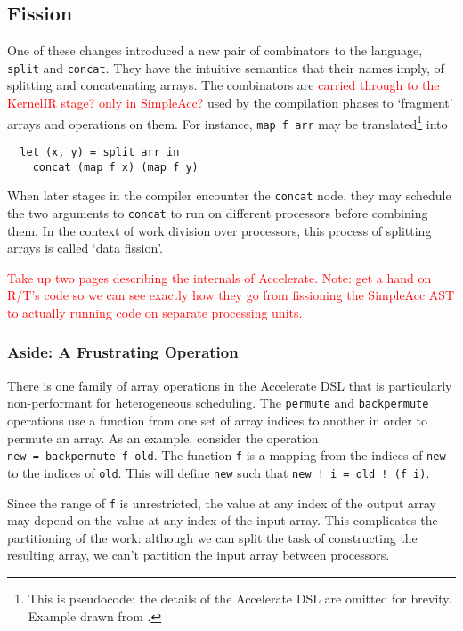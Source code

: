 \documentclass[a4paper,12pt]{article}
\newcommand{\red}[1]{\textcolor{red}{#1}}
\newcommand{\icf}[1]{\mbox{\texttt{#1}}} %
\begin{document}
\subsection{Fission}
One of these changes introduced a new pair of combinators to the language, \icf{split} and \icf{concat}.
They have the intuitive semantics that their names imply, of splitting and concatenating arrays.
The combinators are \red{carried through to the KernelIR stage? only in SimpleAcc?} used by the compilation phases to `fragment' arrays and operations on them.
For instance, \icf{map\ f\ arr} may be translated\footnote{This is pseudocode: the details of the Accelerate DSL are omitted for brevity. Example drawn from \citet{newton_converting_2014}.} into

\begin{verbatim}
  let (x, y) = split arr in
    concat (map f x) (map f y)
\end{verbatim}

When later stages in the compiler encounter the \icf{concat} node, they may schedule the two arguments to \icf{concat} to run on different processors before combining them.
In the context of work division over processors, this process of splitting arrays is called `data fission'. \citep{newton_converting_2014}

\red{Take up two pages describing the internals of Accelerate. Note: get a hand on R/T's code so we can see exactly how they go from fissioning the SimpleAcc AST to actually running code on separate processing units.}

\subsubsection*{Aside: A Frustrating Operation}
There is one family of array operations in the Accelerate DSL that is particularly non-performant for heterogeneous scheduling.
The \icf{permute} and \icf{backpermute} operations use a function from one set of array indices to another in order to permute an array.
As an example, consider the operation \icf{new\ =\ backpermute\ f\ old}.
The function \icf{f} is a mapping from the indices of \icf{new} to the indices of \icf{old}.
This will define \icf{new} such that \icf{new\ !\ i =\ old !\ (f\ i)}.

Since the range of \icf{f} is unrestricted, the value at any index of the output array may depend on the value at any index of the input array.
This complicates the partitioning of the work: although we can split the task of constructing the resulting array, we can't partition the input array between processors.
\end{document}
